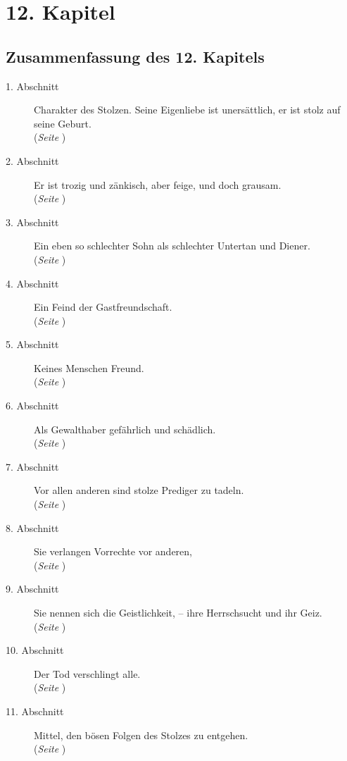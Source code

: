 
\chapter{12. Kapitel} \label{kap12}

\section{Zusammenfassung des 12. Kapitels}
\footnotesize
\begin{description}
\item[1. Abschnitt] Charakter des Stolzen. Seine Eigenliebe ist unersättlich,
er
ist stolz auf seine Geburt.
\\(\textit{Seite \pageref{kap12_ab1}})
\item[2. Abschnitt] Er ist trozig und zänkisch, aber feige, und doch grausam.
\\(\textit{Seite \pageref{kap12_ab2}})
\item[3. Abschnitt] Ein eben so schlechter Sohn als schlechter Untertan und
Diener.
\\(\textit{Seite \pageref{kap12_ab3}})
\item[4. Abschnitt] Ein Feind der Gastfreundschaft.
\\(\textit{Seite \pageref{kap12_ab4}})
\item[5. Abschnitt] Keines Menschen Freund.
\\(\textit{Seite \pageref{kap12_ab5}})
\item[6. Abschnitt] Als Gewalthaber gefährlich und schädlich.
\\(\textit{Seite \pageref{kap12_ab6}})
\item[7. Abschnitt] Vor allen anderen sind stolze Prediger zu tadeln.
\\(\textit{Seite \pageref{kap12_ab7}})
\item[8. Abschnitt] Sie verlangen Vorrechte vor anderen,
\\(\textit{Seite \pageref{kap12_ab8}})
\item[9. Abschnitt] Sie nennen sich die Geistlichkeit, -- ihre Herrschsucht 
und ihr
Geiz.
\\(\textit{Seite \pageref{kap12_ab9}})
\item[10. Abschnitt] Der Tod verschlingt alle.
\\(\textit{Seite \pageref{kap12_ab10}})
\item[11. Abschnitt] Mittel, den bösen Folgen des Stolzes zu entgehen.
\\(\textit{Seite \pageref{kap12_ab11}})
\end{description}
\normalsize

